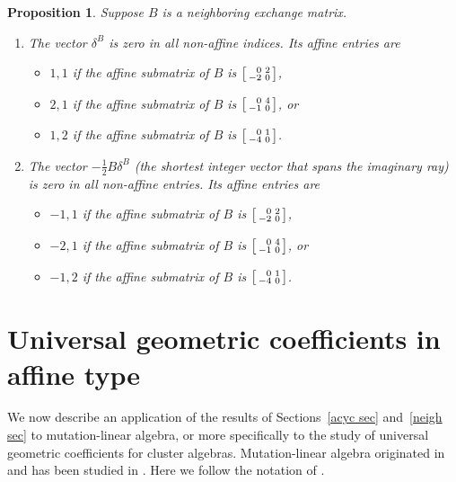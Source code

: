 \documentclass{amsart}
\newtheorem{proposition}{Proposition}[section]
\theoremstyle{definition}
\theoremstyle{remark}
\numberwithin{equation}{section}
\newcommand{\0}{{\mathbf{0}}}
\begin{document}
\begin{proposition}\label{neigh good stuff}
Suppose $B$ is a neighboring exchange matrix.
\begin{enumerate}[label=\bf\arabic*., ref=\arabic*]
\item\label{neigh delta}
The vector $\delta^B$ is zero in all non-affine indices.
Its affine entries are
\begin{itemize}
\item
$1,1$ if the affine submatrix of $B$ is $\begin{bsmallmatrix*}[r]0&2\\-2&0\end{bsmallmatrix*}$,
\item
$2,1$ if the affine submatrix of $B$ is $\begin{bsmallmatrix*}[r]0&4\\-1&0\end{bsmallmatrix*}$, or
\item
$1,2$ if the affine submatrix of $B$ is $\begin{bsmallmatrix*}[r]0&1\\-4&0\end{bsmallmatrix*}$.
\end{itemize}
\item\label{neigh im ray}
The vector $-\frac12B\delta^B$ (the shortest integer vector that spans the imaginary ray) is zero in all non-affine entries.
Its affine entries are
\begin{itemize}
\item
$-1,1$ if the affine submatrix of $B$ is $\begin{bsmallmatrix*}[r]0&2\\-2&0\end{bsmallmatrix*}$,
\item
$-2,1$ if the affine submatrix of $B$ is $\begin{bsmallmatrix*}[r]0&4\\-1&0\end{bsmallmatrix*}$, or
\item
$-1,2$ if the affine submatrix of $B$ is $\begin{bsmallmatrix*}[r]0&1\\-4&0\end{bsmallmatrix*}$.
\end{itemize}
\end{enumerate}
\end{proposition}



\section{Universal geometric coefficients in affine type}\label{univ sec}
We now describe an application of the results of Sections~\ref{acyc sec} and~\ref{neigh sec} to mutation-linear algebra, or more specifically to the study of universal geometric coefficients for cluster algebras.
Mutation-linear algebra originated in \cite{universal} and has been studied in  \cite{unisurface,unitorus,unisphere,dominance}.
Here we follow the notation of \cite{dominance}.
\end{document}
